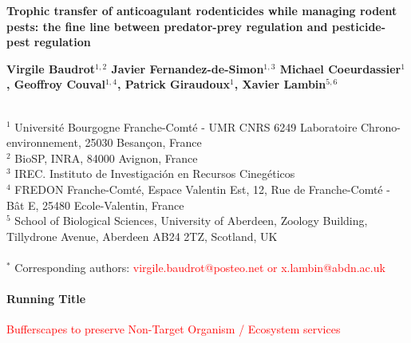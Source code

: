 \documentclass[11pt]{article}
\begin{document}
\begin{center}
	\Large\textbf{
	Trophic transfer of anticoagulant rodenticides while managing rodent pests: the fine line between predator-prey regulation and pesticide-pest regulation
}\par
\end{center}

\vspace{.5cm}

\begin{center}
	\large\textbf{
		Virgile Baudrot$^{1,2}$ 
		Javier Fernandez-de-Simon$^{1,3}$
		Michael Coeurdassier$^1$,
		Geoffroy Couval$^{1,4}$,
		Patrick Giraudoux$^1$,
		Xavier Lambin$^{5,6}$		
	}\par	
\end{center}
~\\
$^1$ Université Bourgogne Franche-Comté - UMR CNRS 6249 Laboratoire Chrono-environnement, 25030 Besançon, France\\
$^2$ BioSP, INRA, 84000 Avignon, France\\
$^3$ IREC. Instituto de Investigación en Recursos Cinegéticos\\
$^4$ FREDON Franche-Comté, Espace Valentin Est, 12, Rue de Franche-Comté - Bât E, 25480 Ecole-Valentin, France\\
$^5$ School of Biological Sciences, University of Aberdeen, Zoology Building, Tillydrone Avenue, Aberdeen AB24 2TZ, Scotland, UK\\
~\\
$^*$ Corresponding authors: \textcolor{red}{virgile.baudrot@posteo.net or x.lambin@abdn.ac.uk}

\paragraph{Running Title} \textcolor{red}{Bufferscapes to preserve Non-Target Organism / Ecosystem services}

\vspace{.5cm}
\end{document}

